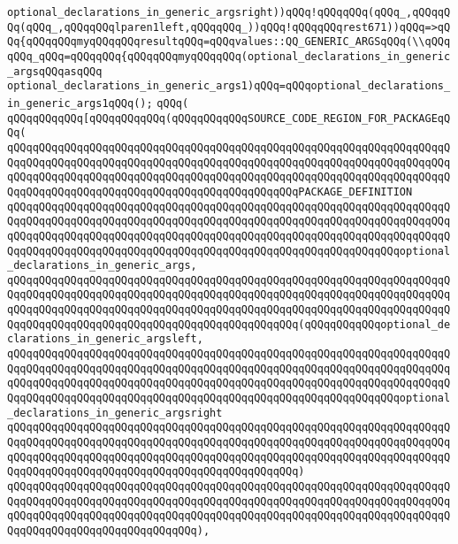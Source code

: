 \verb|optional_declarations_in_generic_argsright))qQQq!qQQqqQQq(qQQq_,qQQqqQQq(qQQq_,qQQqqQQqlparen1left,qQQqqQQq_))qQQq!qQQqqQQqrest671))qQQq=>qQQq{qQQqqQQqmyqQQqqQQqresultqQQq=qQQqvalues::QQ_GENERIC_ARGSqQQq(\\qQQqqQQq_qQQq=qQQqqQQq{qQQqqQQqmyqQQqqQQq(optional_declarations_in_generic_argsqQQqasqQQq|\newline
\verb|optional_declarations_in_generic_args1)qQQq=qQQqoptional_declarations_in_generic_args1qQQq();|\newline
\verb|qQQq(|\newline
\verb|qQQqqQQqqQQq[qQQqqQQqqQQq(qQQqqQQqqQQqSOURCE_CODE_REGION_FOR_PACKAGEqQQq(|\newline
\verb|qQQqqQQqqQQqqQQqqQQqqQQqqQQqqQQqqQQqqQQqqQQqqQQqqQQqqQQqqQQqqQQqqQQqqQQqqQQqqQQqqQQqqQQqqQQqqQQqqQQqqQQqqQQqqQQqqQQqqQQqqQQqqQQqqQQqqQQqqQQqqQQqqQQqqQQqqQQqqQQqqQQqqQQqqQQqqQQqqQQqqQQqqQQqqQQqqQQqqQQqqQQqqQQqqQQqqQQqqQQqqQQqqQQqqQQqqQQqqQQqqQQqqQQqqQQqqQQqPACKAGE_DEFINITION|\newline
\verb|qQQqqQQqqQQqqQQqqQQqqQQqqQQqqQQqqQQqqQQqqQQqqQQqqQQqqQQqqQQqqQQqqQQqqQQqqQQqqQQqqQQqqQQqqQQqqQQqqQQqqQQqqQQqqQQqqQQqqQQqqQQqqQQqqQQqqQQqqQQqqQQqqQQqqQQqqQQqqQQqqQQqqQQqqQQqqQQqqQQqqQQqqQQqqQQqqQQqqQQqqQQqqQQqqQQqqQQqqQQqqQQqqQQqqQQqqQQqqQQqqQQqqQQqqQQqqQQqqQQqqQQqqQQqqQQqoptional_declarations_in_generic_args,|\newline
\verb|qQQqqQQqqQQqqQQqqQQqqQQqqQQqqQQqqQQqqQQqqQQqqQQqqQQqqQQqqQQqqQQqqQQqqQQqqQQqqQQqqQQqqQQqqQQqqQQqqQQqqQQqqQQqqQQqqQQqqQQqqQQqqQQqqQQqqQQqqQQqqQQqqQQqqQQqqQQqqQQqqQQqqQQqqQQqqQQqqQQqqQQqqQQqqQQqqQQqqQQqqQQqqQQqqQQqqQQqqQQqqQQqqQQqqQQqqQQqqQQqqQQqqQQqqQQqqQQq(qQQqqQQqqQQqoptional_declarations_in_generic_argsleft,|\newline
\verb|qQQqqQQqqQQqqQQqqQQqqQQqqQQqqQQqqQQqqQQqqQQqqQQqqQQqqQQqqQQqqQQqqQQqqQQqqQQqqQQqqQQqqQQqqQQqqQQqqQQqqQQqqQQqqQQqqQQqqQQqqQQqqQQqqQQqqQQqqQQqqQQqqQQqqQQqqQQqqQQqqQQqqQQqqQQqqQQqqQQqqQQqqQQqqQQqqQQqqQQqqQQqqQQqqQQqqQQqqQQqqQQqqQQqqQQqqQQqqQQqqQQqqQQqqQQqqQQqqQQqqQQqqQQqqQQqoptional_declarations_in_generic_argsright|\newline
\verb|qQQqqQQqqQQqqQQqqQQqqQQqqQQqqQQqqQQqqQQqqQQqqQQqqQQqqQQqqQQqqQQqqQQqqQQqqQQqqQQqqQQqqQQqqQQqqQQqqQQqqQQqqQQqqQQqqQQqqQQqqQQqqQQqqQQqqQQqqQQqqQQqqQQqqQQqqQQqqQQqqQQqqQQqqQQqqQQqqQQqqQQqqQQqqQQqqQQqqQQqqQQqqQQqqQQqqQQqqQQqqQQqqQQqqQQqqQQqqQQqqQQqqQQqqQQqqQQq)|\newline
\verb|qQQqqQQqqQQqqQQqqQQqqQQqqQQqqQQqqQQqqQQqqQQqqQQqqQQqqQQqqQQqqQQqqQQqqQQqqQQqqQQqqQQqqQQqqQQqqQQqqQQqqQQqqQQqqQQqqQQqqQQqqQQqqQQqqQQqqQQqqQQqqQQqqQQqqQQqqQQqqQQqqQQqqQQqqQQqqQQqqQQqqQQqqQQqqQQqqQQqqQQqqQQqqQQqqQQqqQQqqQQqqQQqqQQqqQQqqQQqqQQq),|\newline
